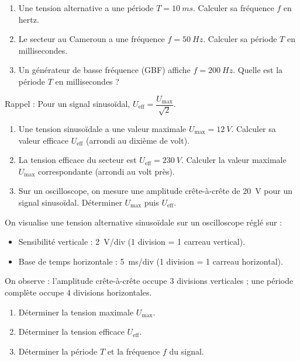 \documentclass[11pt]{article}
\begin{document}
\begin{exercice}
\begin{enumerate}
    \item Une tension alternative a une période $T = \SI{10}{ms}$. Calculer sa fréquence $f$ en hertz.
    \item Le secteur au Cameroun a une fréquence $f = \SI{50}{Hz}$. Calculer sa période $T$ en millisecondes.
    \item Un générateur de basse fréquence (GBF) affiche $f = \SI{200}{Hz}$. Quelle est la période $T$ en millisecondes ?
\end{enumerate}
\end{exercice}

\begin{exercice}
Rappel : Pour un signal sinusoïdal, $U_{\text{eff}} = \dfrac{U_{\text{max}}}{\sqrt{2}}$.
\begin{enumerate}
    \item Une tension sinusoïdale a une valeur maximale $U_{\text{max}} = \SI{12}{V}$. Calculer sa valeur efficace $U_{\text{eff}}$ (arrondi au dixième de volt).
    \item La tension efficace du secteur est $U_{\text{eff}} = \SI{230}{V}$. Calculer la valeur maximale $U_{\text{max}}$ correspondante (arrondi au volt près).
    \item Sur un oscilloscope, on mesure une amplitude crête-à-crête de \SI{20}{V} pour un signal sinusoïdal. Déterminer $U_{\text{max}}$ puis $U_{\text{eff}}$.
\end{enumerate}
\end{exercice}

\begin{exercice}
On visualise une tension alternative sinusoïdale sur un oscilloscope réglé sur :
\begin{itemize}
    \item Sensibilité verticale : \SI{2}{V/div} (1 division = 1 carreau vertical).
    \item Base de temps horizontale : \SI{5}{ms/div} (1 division = 1 carreau horizontal).
\end{itemize}
On observe : l'amplitude crête-à-crête occupe 3 divisions verticales ; une période complète occupe 4 divisions horizontales.
\begin{enumerate}
    \item Déterminer la tension maximale $U_{\text{max}}$.
    \item Déterminer la tension efficace $U_{\text{eff}}$.
    \item Déterminer la période $T$ et la fréquence $f$ du signal.
\end{enumerate}
\end{exercice}
\end{document}
